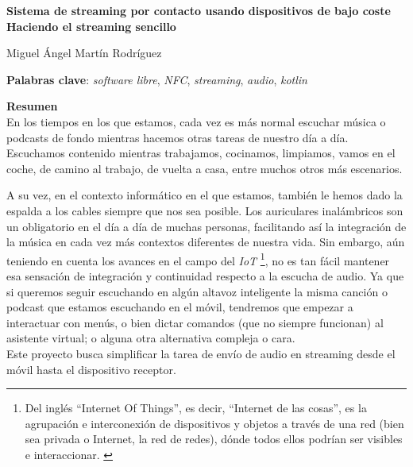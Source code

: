 \thispagestyle{empty}

\begin{center}
{\large\bfseries Sistema de streaming por contacto usando dispositivos de bajo coste \\ Haciendo el streaming sencillo }\\
\end{center}
\begin{center}
Miguel Ángel Martín Rodríguez\\
\end{center}


\vspace{0.5cm}
\noindent\textbf{Palabras clave}: \textit{software libre}, \textit{NFC}, \textit{streaming}, \textit{audio}, \textit{kotlin}
\vspace{0.7cm}

\noindent\textbf{Resumen}\\
En los tiempos en los que estamos, cada vez es más normal escuchar música o
podcasts de fondo mientras hacemos otras tareas de nuestro día a día. Escuchamos
contenido mientras trabajamos, cocinamos, limpiamos, vamos en el coche, de
camino al trabajo, de vuelta a casa, entre muchos otros más escenarios. 

A su vez, en el contexto informático en el que estamos, también le hemos dado la
espalda a los cables siempre que nos sea posible. Los auriculares inalámbricos
son un obligatorio en el día a día de muchas personas, facilitando así la
integración de la música en cada vez más contextos diferentes de nuestra vida.
Sin embargo, aún teniendo en cuenta los avances en el campo del \emph{IoT}
\footnote{Del inglés ``Internet Of Things'', es decir, ``Internet de las cosas'', es
la agrupación e interconexión de dispositivos y objetos a través de una red
(bien sea privada o Internet, la red de redes), dónde todos ellos podrían ser
visibles e interaccionar. \cite{IoT}}, no es tan fácil mantener esa sensación de
integración y continuidad respecto a la escucha de audio. Ya que si queremos
seguir escuchando en algún altavoz inteligente la misma canción o podcast que
estamos escuchando en el móvil, tendremos que empezar a interactuar con menús,
o bien dictar comandos (que no siempre funcionan) al asistente virtual; o alguna otra
alternativa compleja o cara.\\

Este proyecto busca simplificar la tarea de envío de audio en streaming desde el
móvil hasta el dispositivo receptor.

